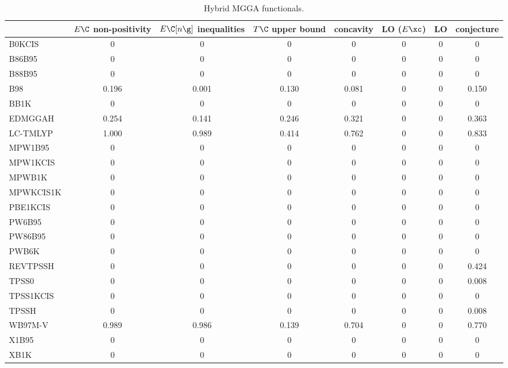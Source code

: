 \begin{table}
\caption{Hybrid MGGA functionals.}
\begin{tabular}{|l|c|c|c|c|c|c|c|}
\toprule
 & $E\C$ non-positivity & $E\C[n\g]$ inequalities & $T\C$ upper bound & concavity & LO ($E\xc$) & LO & conjecture \\
\midrule
B0KCIS~\cite{Toulouse2002_10465} & 0 & 0 & 0 & 0 & 0 & 0 & 0 \\
B86B95~\cite{Becke1996_1040} & 0 & 0 & 0 & 0 & 0 & 0 & 0 \\
B88B95~\cite{Becke1996_1040} & 0 & 0 & 0 & 0 & 0 & 0 & 0 \\
B98~\cite{Becke1998_2092} & 0.196 & 0.001 & 0.130 & 0.081 & 0 & 0 & 0.150 \\
BB1K~\cite{Zhao2004_2715} & 0 & 0 & 0 & 0 & 0 & 0 & 0 \\
EDMGGAH~\cite{Tao2002_2335} & 0.254 & 0.141 & 0.246 & 0.321 & 0 & 0 & 0.363 \\
LC-TMLYP~\cite{Jana2018_1} & 1.000 & 0.989 & 0.414 & 0.762 & 0 & 0 & 0.833 \\
MPW1B95~\cite{Zhao2004_6908} & 0 & 0 & 0 & 0 & 0 & 0 & 0 \\
MPW1KCIS~\cite{Zhao2005_2012} & 0 & 0 & 0 & 0 & 0 & 0 & 0 \\
MPWB1K~\cite{Zhao2004_6908} & 0 & 0 & 0 & 0 & 0 & 0 & 0 \\
MPWKCIS1K~\cite{Zhao2005_2012} & 0 & 0 & 0 & 0 & 0 & 0 & 0 \\
PBE1KCIS~\cite{Zhao2005_415} & 0 & 0 & 0 & 0 & 0 & 0 & 0 \\
PW6B95~\cite{Zhao2005_5656} & 0 & 0 & 0 & 0 & 0 & 0 & 0 \\
PW86B95~\cite{Becke1996_1040} & 0 & 0 & 0 & 0 & 0 & 0 & 0 \\
PWB6K~\cite{Zhao2005_5656} & 0 & 0 & 0 & 0 & 0 & 0 & 0 \\
REVTPSSH~\cite{Csonka2010_3688} & 0 & 0 & 0 & 0 & 0 & 0 & 0.424 \\
TPSS0~\cite{Grimme2005_3067} & 0 & 0 & 0 & 0 & 0 & 0 & 0.008 \\
TPSS1KCIS~\cite{Zhao2005_43} & 0 & 0 & 0 & 0 & 0 & 0 & 0 \\
TPSSH~\cite{Staroverov2003_12129} & 0 & 0 & 0 & 0 & 0 & 0 & 0.008 \\
WB97M-V~\cite{Mardirossian2016_214110} & 0.989 & 0.986 & 0.139 & 0.704 & 0 & 0 & 0.770 \\
X1B95~\cite{Zhao2004_6908} & 0 & 0 & 0 & 0 & 0 & 0 & 0 \\
XB1K~\cite{Zhao2004_6908} & 0 & 0 & 0 & 0 & 0 & 0 & 0 \\
\bottomrule
\end{tabular}
\end{table}
